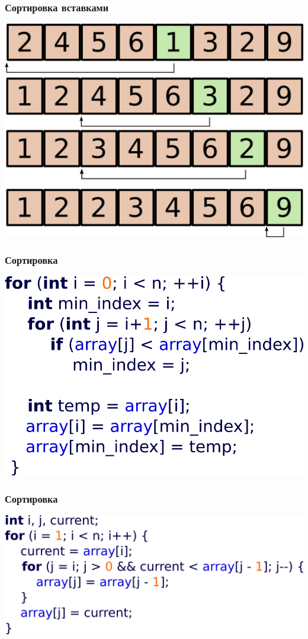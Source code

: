 \documentclass[14pt,pdf,hyperref={unicode}]{beamer}
\begin{document}
\begin{frame}[fragile]
\frametitle{Сортировка вставками} 
\begin{center}
\includegraphics[scale=0.85]{images/sorting_insert_4in1_2.png}
\end{center}
\end{frame}

\begin{frame}[fragile]
\frametitle{Сортировка} 
\begin{center}
\includegraphics[scale=0.95]{images/chose_sort_code.png}
\end{center}
\end{frame}


\begin{frame}[fragile]
\frametitle{Сортировка} 
\begin{center}
\includegraphics[scale=0.95]{images/insertion_sort_code.png}
\end{center}
\end{frame}
\end{document}
